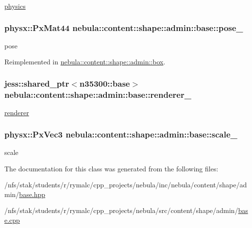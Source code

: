 \hyperlink{namespacenebula_1_1content_1_1shape_1_1physics}{physics} \hypertarget{classnebula_1_1content_1_1shape_1_1admin_1_1base_a990f8b017a93fb4e430fc7ab880c5f27}{
\subsubsection[{pose\_\-}]{\setlength{\rightskip}{0pt plus 5cm}physx::PxMat44 {\bf nebula::content::shape::admin::base::pose\_\-}}}
\label{classnebula_1_1content_1_1shape_1_1admin_1_1base_a990f8b017a93fb4e430fc7ab880c5f27}


pose 

Reimplemented in \hyperlink{classnebula_1_1content_1_1shape_1_1admin_1_1box_a6365e7e95570a051c89eb187e1442c55}{nebula::content::shape::admin::box}.\hypertarget{classnebula_1_1content_1_1shape_1_1admin_1_1base_a4f3b558a14ae2c8f753e3201ea737383}{
\subsubsection[{renderer\_\-}]{\setlength{\rightskip}{0pt plus 5cm}jess::shared\_\-ptr$<${\bf n35300::base}$>$ {\bf nebula::content::shape::admin::base::renderer\_\-}}}
\label{classnebula_1_1content_1_1shape_1_1admin_1_1base_a4f3b558a14ae2c8f753e3201ea737383}


\hyperlink{namespacenebula_1_1content_1_1shape_1_1renderer}{renderer} \hypertarget{classnebula_1_1content_1_1shape_1_1admin_1_1base_a87478bfe3d7311d7480b5b24e5fc286b}{
\subsubsection[{scale\_\-}]{\setlength{\rightskip}{0pt plus 5cm}physx::PxVec3 {\bf nebula::content::shape::admin::base::scale\_\-}}}
\label{classnebula_1_1content_1_1shape_1_1admin_1_1base_a87478bfe3d7311d7480b5b24e5fc286b}


scale 

The documentation for this class was generated from the following files:\begin{DoxyCompactItemize}
\item 
/nfs/stak/students/r/rymalc/cpp\_\-projects/nebula/inc/nebula/content/shape/admin/\hyperlink{inc_2nebula_2content_2shape_2admin_2base_8hpp}{base.hpp}\item 
/nfs/stak/students/r/rymalc/cpp\_\-projects/nebula/src/content/shape/admin/\hyperlink{src_2content_2shape_2admin_2base_8cpp}{base.cpp}\end{DoxyCompactItemize}
